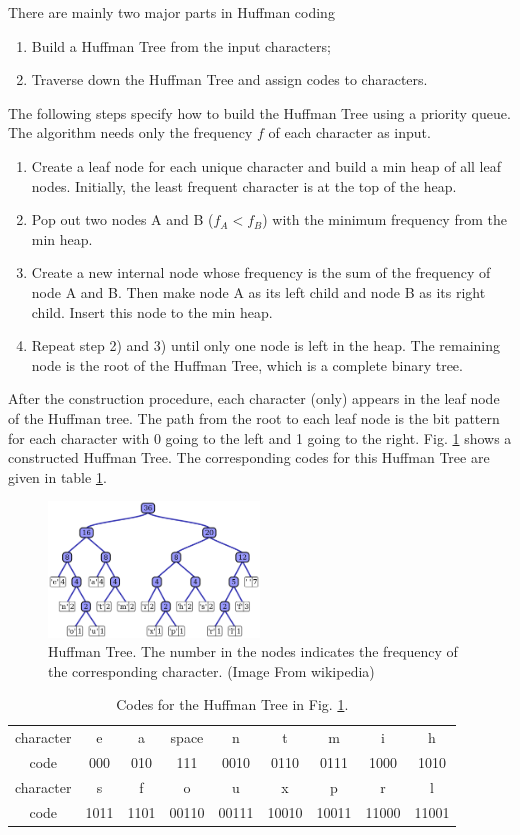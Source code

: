 \documentclass[11pt]{article}
\begin{document}
There are mainly two major parts in Huffman coding
\begin{enumerate}
\item Build a Huffman Tree from the input characters;
\item Traverse down the Huffman Tree and assign codes to characters.
\end{enumerate}
The following steps specify how to build the Huffman Tree using a priority queue. The algorithm needs only the frequency $f$ of each character as input.
\begin{enumerate}
\item Create a leaf node for each unique character and build a min heap of all leaf nodes. Initially, the least frequent character is at the top of the heap.
\item Pop out two nodes A and B ($f_A < f_B$) with the minimum frequency from the min heap.
\item Create a new internal node whose frequency is the sum of the frequency of node A and B. Then make node A as its left child and node B as its right child. Insert this node to the min heap.
\item Repeat step 2) and 3) until only one node is left in the heap. The remaining node is the root of the Huffman Tree, which is a complete binary tree.  
\end{enumerate}
After the construction procedure, each character (only) appears in the leaf node of the Huffman tree. The path from the root to each leaf node is the bit pattern for each character with 0 going to the left and 1 going to the right. Fig. \ref{huffman_tree} shows a constructed Huffman Tree. The corresponding codes for this Huffman Tree are given in table \ref{huffman_code}.
\begin{figure}
	\centering
	\includegraphics[width=0.5\textwidth]{images/huffman_tree.png}
	\caption{Huffman Tree. The number in the nodes indicates the frequency of the corresponding character. (Image From wikipedia)}
	\label{huffman_tree}
\end{figure}
\begin{table}
	\centering
	\caption{Codes for the Huffman Tree in Fig. \ref{huffman_tree}.}
	\label{huffman_code}
	\begin{tabular}{ccccccccc}
		\hline
		character & e & a & space & n & t & m & i & h\\
		code & 000 & 010 & 111 & 0010 & 0110 & 0111 &1000 & 1010 \\
		\hline
		character & s & f & o & u & x & p & r & l \\
		code & 1011 & 1101 & 00110 & 00111 & 10010 & 10011 &11000 & 11001 \\
		\hline
	\end{tabular}
\end{table}
\end{document}
